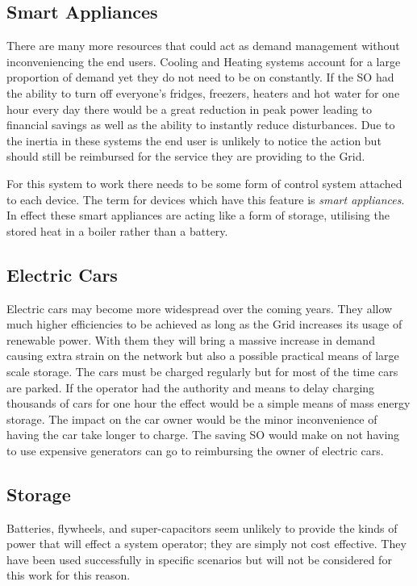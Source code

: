 \documentclass[a4paper,oneside,12pt]{report}
\begin{document}
\subsection{Smart Appliances}

There are many more resources that could act as demand management without inconveniencing the end users. Cooling and Heating systems account for a large proportion of demand yet they do not need to be on constantly. If the SO had the ability to turn off everyone's fridges, freezers, heaters and hot water for one hour every day there would be a great reduction in peak power leading to financial savings as well as the ability to instantly reduce disturbances. Due to the inertia in these systems the end user is unlikely to notice the action but should still be reimbursed for the service they are providing to the Grid.

For this system to work there needs to be some form of control system attached to each device. The term for devices which have this feature is \emph{smart appliances}. In effect these smart appliances are acting like a form of storage, utilising the stored heat in a boiler rather than a battery.

\subsection{Electric Cars}

Electric cars may become more widespread over the coming years. They allow much higher efficiencies to be achieved as long as the Grid increases its usage of renewable power. With them they will bring a massive increase in demand causing extra strain on the network but also a possible practical means of large scale storage. The cars must be charged regularly but for most of the time cars are parked. If the operator had the authority and means to delay charging thousands of cars for one hour the effect would be a simple means of mass energy storage. The impact on the car owner would be the minor inconvenience of having the car take longer to charge. The saving SO would make on not having to use expensive generators can go to reimbursing the owner of electric cars.

\subsection{Storage}

Batteries, flywheels, and super-capacitors seem unlikely to provide the kinds of power that will effect a system operator; they are simply not cost effective. They have been used successfully in specific scenarios but will not be considered for this work for this reason.
\end{document}
